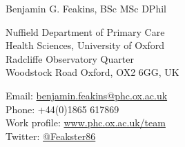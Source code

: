 \documentclass[10pt,a4paper]{article}
\def\name{Benjamin G. Feakins, BSc MSc DPhil}
\begin{document}
{\huge \name}

\vspace{0.25in}

\begin{minipage}[t]{0.5\textwidth}
  \raggedright
  Nuffield Department of Primary Care \\
  Health Sciences, University of Oxford \\
  Radcliffe Observatory Quarter \\
  Woodstock Road Oxford, OX2 6GG, UK \\
\end{minipage}\begin{minipage}[t]{0.5\textwidth}
  \raggedright
  Email: \href{mailto:benjamin.feakins@phc.ox.ac.uk}{benjamin.feakins@phc.ox.ac.uk} \\
  Phone: +44(0)1865 617869 \\
  Work profile: \href{https://www.phc.ox.ac.uk/team/ben-feakins}{www.phc.ox.ac.uk/team} \\
  Twitter:  \href{https://twitter.com/Feakster86}{@Feakster86} \\
\end{minipage}

\vspace{0.25in}

\sloppy
\end{document}
